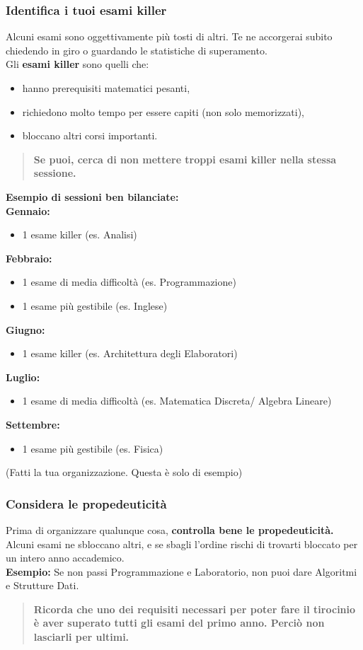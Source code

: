 \documentclass[18pt]{extarticle}
\begin{document}
\subsubsection{Identifica i tuoi esami killer}
Alcuni esami sono oggettivamente più tosti di altri. Te ne accorgerai subito chiedendo in giro o guardando le statistiche di superamento.\\
Gli \textbf{esami killer} sono quelli che:
\begin{itemize}
\item hanno prerequisiti matematici pesanti,
\item richiedono molto tempo per essere capiti (non solo memorizzati),
\item bloccano altri corsi importanti.
\end{itemize}
\begin{quote}
\textbf{Se puoi, cerca di non mettere troppi esami killer nella stessa sessione.}
\end{quote}
\textbf{Esempio di sessioni ben bilanciate:}\\
\textbf{Gennaio:}
\begin{itemize}
\item 1 esame killer (es. Analisi)
\end{itemize}
\textbf{Febbraio:}
\begin{itemize}
\item 1 esame di media difficoltà (es. Programmazione)
\item 1 esame più gestibile (es. Inglese)
\end{itemize}
\textbf{Giugno:}
\begin{itemize}
\item 1 esame killer (es. Architettura degli Elaboratori)
\end{itemize}
\textbf{Luglio:}
\begin{itemize}
\item 1 esame di media difficoltà (es. Matematica Discreta/ Algebra Lineare)
\end{itemize}
\textbf{Settembre:}
\begin{itemize}
\item 1 esame più gestibile (es. Fisica)
\end{itemize}
(Fatti la tua organizzazione. Questa è solo di esempio)


\subsubsection{Considera le propedeuticità}
Prima di organizzare qualunque cosa, \textbf{controlla bene le propedeuticità.}  
Alcuni esami ne sbloccano altri, e se sbagli l'ordine rischi di trovarti bloccato per un intero anno accademico.\\
\textbf{Esempio:} Se non passi Programmazione e Laboratorio, non puoi dare Algoritmi e Strutture Dati.\\
\begin{quote}
\textbf{Ricorda che uno dei requisiti necessari per poter fare il tirocinio è aver superato tutti gli esami del primo anno. Perciò non lasciarli per ultimi.}
\end{quote}
\end{document}
